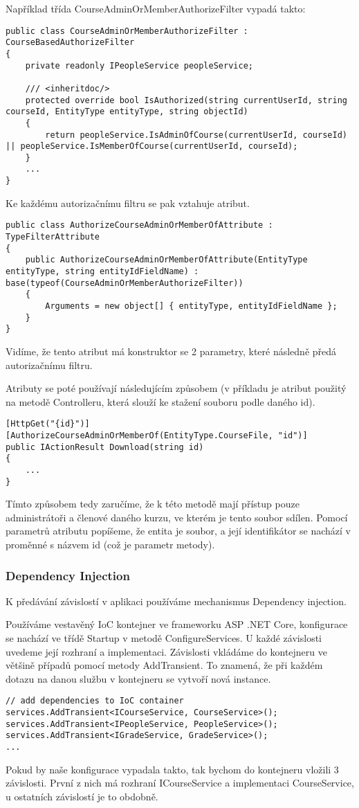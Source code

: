 Například třída CourseAdminOrMemberAuthorizeFilter vypadá takto:
\begin{lstlisting}
public class CourseAdminOrMemberAuthorizeFilter : CourseBasedAuthorizeFilter
{
	private readonly IPeopleService peopleService;
	
	/// <inheritdoc/>
	protected override bool IsAuthorized(string currentUserId, string courseId, EntityType entityType, string objectId)
	{
		return peopleService.IsAdminOfCourse(currentUserId, courseId) || peopleService.IsMemberOfCourse(currentUserId, courseId);
	}
	...
}
\end{lstlisting}

Ke každému autorizačnímu filtru se pak vztahuje atribut.
\begin{lstlisting}
public class AuthorizeCourseAdminOrMemberOfAttribute : TypeFilterAttribute
{
	public AuthorizeCourseAdminOrMemberOfAttribute(EntityType entityType, string entityIdFieldName) : base(typeof(CourseAdminOrMemberAuthorizeFilter))
	{
		Arguments = new object[] { entityType, entityIdFieldName };
	}
}
\end{lstlisting}

Vidíme, že tento atribut má konstruktor se 2 parametry, které následně předá autorizačnímu filtru. 

Atributy se poté používají následujícím způsobem (v příkladu je atribut použitý na metodě Controlleru, která slouží ke stažení souboru podle daného id).
\begin{lstlisting}
[HttpGet("{id}")]
[AuthorizeCourseAdminOrMemberOf(EntityType.CourseFile, "id")]
public IActionResult Download(string id)
{
	...
}
\end{lstlisting}

Tímto způsobem tedy zaručíme, že k této metodě mají přístup pouze administrátoři a členové daného kurzu, ve kterém je tento soubor sdílen. Pomocí parametrů atributu popíšeme, že entita je soubor, a její identifikátor se nachází v proměnné s názvem id (což je parametr metody).

\subsubsection*{Dependency Injection}

K předávání závislostí v aplikaci používáme mechanismus Dependency injection. 

Používáme vestavěný IoC kontejner ve frameworku ASP .NET Core, konfigurace se nachází ve třídě Startup v metodě ConfigureServices.
U každé závislosti uvedeme její rozhraní a implementaci. 
Závislosti vkládáme do kontejneru ve většině případů pomocí metody AddTransient. To znamená, že při každém dotazu na danou službu v kontejneru se vytvoří nová instance.
\begin{lstlisting}
// add dependencies to IoC container
services.AddTransient<ICourseService, CourseService>();
services.AddTransient<IPeopleService, PeopleService>();
services.AddTransient<IGradeService, GradeService>();
...
\end{lstlisting}
Pokud by naše konfigurace vypadala takto, tak bychom do kontejneru vložili 3 závislosti. První z nich má rozhraní ICourseService a implementaci CourseService, u ostatních závislostí je to obdobně.

